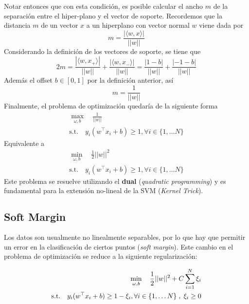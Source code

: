 Notar entonces que con esta condición, es posible calcular el ancho $m$ de la separación entre el hiper-plano y el vector de soporte. Recordemos que la distancia $m$ de un vector $x$ a un hiperplano con vector normal $w$ viene dada por 
$$m = \frac{|\langle w, x \rangle|}{||w||}$$
Considerando la definición de los vectores de soporte, se tiene que 
$$2m = \frac{|\langle w, x_{+} \rangle|}{||w||} + \frac{|\langle w, x_{-} \rangle|}{||w||} = \frac{|1-b|}{||w||} + \frac{|-1-b|}{||w||}$$
Además el offset $b \in [0,1]$ por la definición anterior, así 
$$m = \frac{1}{||w||}$$
Finalmente, el problema de optimización quedaría de la siguiente forma 
\begin{equation*}
\begin{aligned}
\max_{\omega , b} \quad \frac{1}{||w||} \\
\textrm{s.t.} \quad y_i(w^{\top}x_i + b ) \geq 1 , \forall i \in \{ 1 , \dots N \}
\end{aligned}
\end{equation*}
Equivalente a 
\begin{equation*}
\begin{aligned}
\min_{\omega , b} \quad \frac{1}{2}||w||^2 \\
\textrm{s.t.} \quad y_i(w^{\top}x_i + b ) \geq 1 , \forall i \in \{ 1 , \dots N \}
\end{aligned}
\end{equation*}
Este problema se resuelve utilizando el \textbf{dual} (\textit{quadratic programming}) y es fundamental para la extensión no-lineal de la SVM (\textit{Kernel Trick}). 

\subsection{Soft Margin}

Los datos son usualmente no linealmente separables, por lo que hay que permitir un error en la clasificación de ciertos puntos (\textit{soft margin}). Este cambio en el problema de optimización se reduce a la siguiente regularización:

\begin{equation*}
\begin{aligned}
\min_{\omega , b} \quad \frac{1}{2}||w||^2 + C \sum_{i=1}^N \xi_i  \\
\textrm{s.t.} \quad y_i(w^{\top}x_i + b ) \geq 1  - \xi_i, \forall i \in \{ 1 , \dots N \} \hspace{0.1cm} ,\hspace{0.1cm} \xi_i \geq 0
\end{aligned}
\end{equation*}

